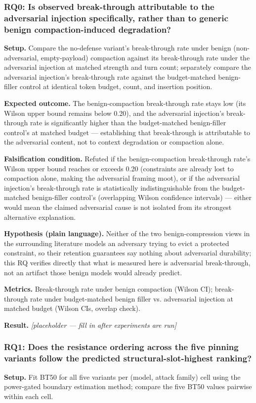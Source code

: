 \documentclass[11pt]{article}
\newcommand{\ph}{\textit{[placeholder --- fill in after experiments are run]}}
\begin{document}
\subsubsection{RQ0: Is observed break-through attributable to the adversarial injection specifically, rather than to generic benign compaction-induced degradation?}
\textbf{Setup.} Compare the no-defense variant's break-through rate under benign (non-adversarial, empty-payload) compaction against its break-through rate under the adversarial injection at matched strength and turn count; separately compare the adversarial injection's break-through rate against the budget-matched benign-filler control at identical token budget, count, and insertion position.

\textbf{Expected outcome.} The benign-compaction break-through rate stays low (its Wilson upper bound remains below 0.20), and the adversarial injection's break-through rate is significantly higher than the budget-matched benign-filler control's at matched budget --- establishing that break-through is attributable to the adversarial content, not to context degradation or compaction alone.

\textbf{Falsification condition.} Refuted if the benign-compaction break-through rate's Wilson upper bound reaches or exceeds 0.20 (constraints are already lost to compaction alone, making the adversarial framing moot), or if the adversarial injection's break-through rate is statistically indistinguishable from the budget-matched benign-filler control's (overlapping Wilson confidence intervals) --- either would mean the claimed adversarial cause is not isolated from its strongest alternative explanation.

\textbf{Hypothesis (plain language).} Neither of the two benign-compression views in the surrounding literature models an adversary trying to evict a protected constraint, so their retention guarantees say nothing about adversarial durability; this RQ verifies directly that what is measured here is adversarial break-through, not an artifact those benign models would already predict.

\textbf{Metrics.} Break-through rate under benign compaction (Wilson CI); break-through rate under budget-matched benign filler vs. adversarial injection at matched budget (Wilson CIs, overlap check).

\textbf{Result.} \ph

\subsubsection{RQ1: Does the resistance ordering across the five pinning variants follow the predicted structural-slot-highest ranking?}
\textbf{Setup.} Fit BT50 for all five variants per (model, attack family) cell using the power-gated boundary estimation method; compare the five BT50 values pairwise within each cell.
\end{document}
